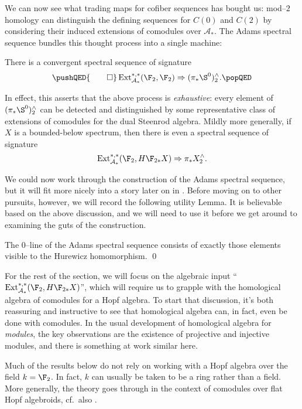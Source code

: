 We can now see what trading maps for cofiber sequences has bought us: mod--$2$ homology can distinguish the defining sequences for $C(0)$ and $C(2)$ by considering their induced extensions of comodules over $\mathcal A_*$.
The Adams spectral sequence bundles this thought process into a single machine:
\begin{theorem}
There is a convergent spectral sequence of signature
\[
\pushQED{\qed}
\Ext_{\mathcal A_*}^{*, *}(\F_2, \F_2) \Rightarrow (\pi_* \S^0)^\wedge_2.\qedhere
\popQED
\]
\end{theorem}
In effect, this asserts that the above process is \emph{exhaustive}: every element of $(\pi_* \S^0)^\wedge_2$ can be detected and distinguished by some representative class of extensions of comodules for the dual Steenrod algebra.  Mildly more generally, if $X$ is a bounded-below spectrum, then there is even a spectral sequence of signature \[\Ext_{\mathcal A_*}^{*, *}(\F_2, H\F_{2*} X) \Rightarrow \pi_* X^\wedge_2.\]

We could now work through the construction of the Adams spectral sequence, but it will fit more nicely into a story later on in .  Before moving on to other pursuits, however, we will record the following utility Lemma.  It is believable based on the above discussion, and we will need to use it before we get around to examining the guts of the construction.
\begin{lemma}\label{HurewiczImageOnZeroLine}
The $0$--line of the Adams spectral sequence consists of exactly those elements visible to the Hurewicz homomorphism. \qed
\end{lemma}

For the rest of the section, we will focus on the algebraic input ``$\Ext_{\mathcal A_*}^{*, *}(\F_2, H\F_{2*} X)$'', which will require us to grapple with the homological algebra of comodules for a Hopf algebra.  To start that discussion, it's both reassuring and instructive to see that homological algebra can, in fact, even be done with comodules.  In the usual development of homological algebra for \emph{modules}, the key observations are the existence of projective and injective modules, and there is something at work similar here.

\begin{remark}
Much of the results below do not rely on working with a Hopf algebra over the field $k = \F_2$.  In fact, $k$ can usually be taken to be a ring rather than a field. More generally, the theory goes through in the context of comodules over flat Hopf algebroids, cf.\ also .
\end{remark}

